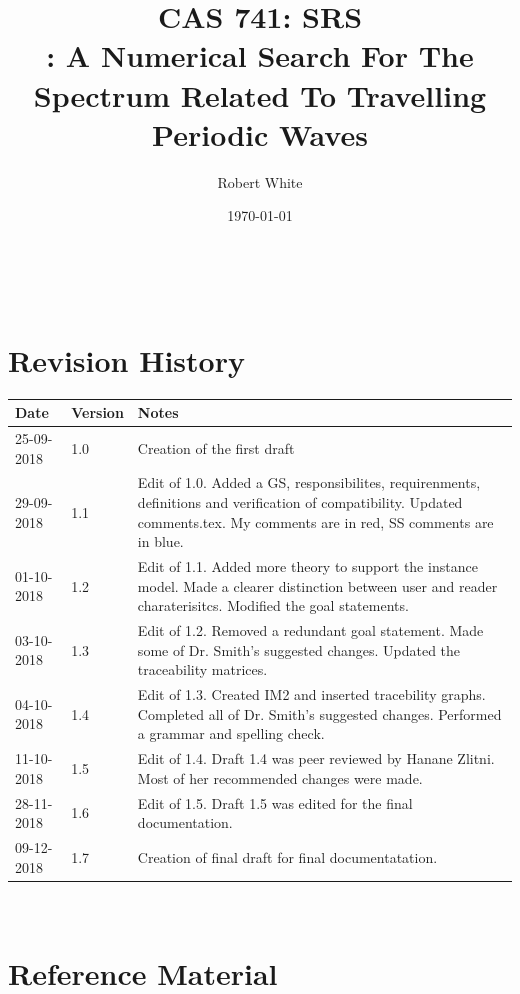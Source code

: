 \documentclass[12pt]{article}
\begin{document}
\title{CAS 741: SRS \\ \progname : A Numerical Search For The Spectrum Related 
To 
Travelling 
Periodic Waves} 
\author{Robert White}
\date{\today}
	
\maketitle

~\newpage


\section{Revision History}

\begin{tabularx}{\textwidth}{p{3cm}p{2cm}X}
\toprule {\bf Date} & {\bf Version} & {\bf Notes}\\
\midrule
25-09-2018 & 1.0 & Creation of the first draft\\
29-09-2018 & 1.1 & Edit of 1.0. Added a GS, responsibilites, requirenments, 
definitions and verification of compatibility. Updated comments.tex. My 
comments are in red, SS comments are in blue.\\ 
01-10-2018 & 1.2 & Edit of 1.1. Added more theory to support the instance 
model. Made a clearer distinction between user and reader charaterisitcs. 
Modified the goal statements.  \\ 
03-10-2018 & 1.3 & Edit of 1.2. Removed a redundant goal statement. Made some 
of Dr. 
Smith's suggested changes. Updated the traceability matrices.  \\
04-10-2018 & 1.4 & Edit of 1.3. Created IM2 and inserted tracebility graphs. 
Completed all of Dr. Smith's suggested changes. Performed a grammar and 
spelling check.\\ 
11-10-2018 & 1.5& Edit of 1.4. Draft 1.4 was peer reviewed by Hanane Zlitni. 
Most of her recommended changes were made. \\
28-11-2018& 1.6& Edit of 1.5. Draft 1.5 was edited for the final 
documentation.\\ 
09-12-2018& 1.7& Creation of final draft for final documentatation.\\
\bottomrule
\end{tabularx}

~\newpage

\section{Reference Material}
\end{document}
